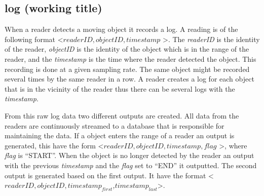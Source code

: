 \subsection{log (working title)}

When a reader detects a moving object it records a log. 
A reading is of the following format \textless $readerID,objectID,timestamp$ \textgreater.
The \textit{readerID} is the identity of the reader, \textit{objectID} is the identity of the object which is in the range of the reader, and the \textit{timestamp} is the time where the reader detected the object.
This recording is done at a given sampling rate. 
The same object might be recorded several times by the same reader in a row. 
A reader creates a log for each object that is in the vicinity of the reader thus there can be several logs with the \textit{timestamp}.

From this raw log data two different outputs are created.
All data from the readers are continuously streamed to a database that is responsible for maintaining the data.
If a object enters the range of a reader an output is generated, this have the form \textless $readerID,objectID,timestamp,flag$ \textgreater, where \textit{flag} is "`START"'. 
When the object is no longer detected by the reader an output with the previous \textit{timestamp} and the \textit{flag} set to "`END"' it outputted.
The second output is generated based on the first output. 
It have the format \textless\textit{$readerID,objectID,timestamp_{first}$,$timestamp_{last}$}\textgreater .


 
